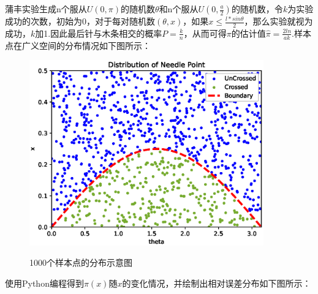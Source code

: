 \documentclass[12pt,a4paper]{article}%
\begin{document}
蒲丰实验生成n个服从$U(0,\pi)$的随机数$\theta$和n个服从$U(0,\frac{a}{2})$的随机数，令$k$为实验成功的次数，初始为0，对于每对随机数$(\theta,x)$，如果$x\leq \frac{l*sin \theta}{2}$，那么实验就视为成功，$k$加1.因此最后针与木条相交的概率$P=\frac{k}{n}$，从而可得$\pi$的估计值$\hat{\pi}=\frac{2ln}{ak}$.样本点在广义空间的分布情况如下图所示：

\begin{figure}[htbp]
    \centering
    \includegraphics[height=8cm]{样本点示意图.eps}\label{样本点分布图}
    \caption{1000个样本点的分布示意图}
\end{figure}

使用Python编程得到$\pi(x)$随$x$的变化情况，并绘制出相对误差分布如下图所示：
\end{document}
